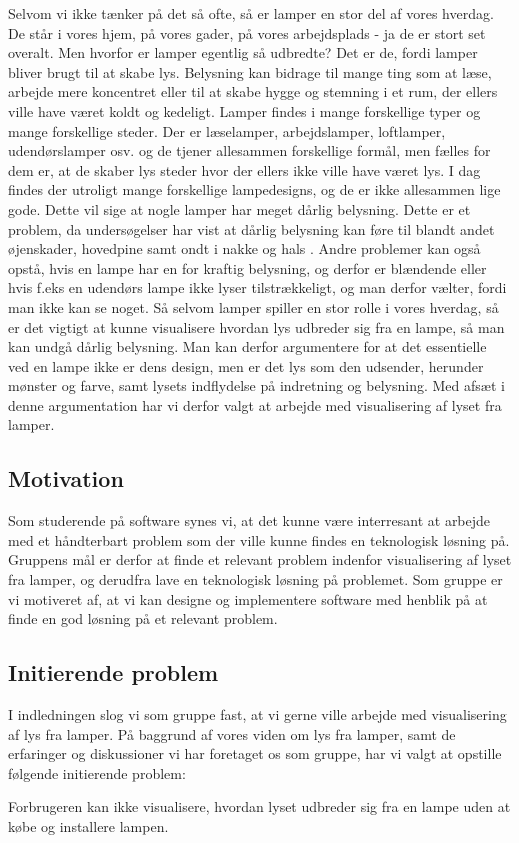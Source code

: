 Selvom vi ikke tænker på det så ofte, så er lamper en stor del af vores hverdag. De står i vores hjem, på vores gader, på vores arbejdsplads - ja de er stort set overalt. Men hvorfor er lamper egentlig så udbredte? Det er de, fordi lamper bliver brugt til at skabe lys. Belysning kan bidrage til mange ting som at læse, arbejde mere koncentret eller til at skabe hygge og stemning i et rum, der ellers ville have været koldt og kedeligt. 
\newline Lamper findes i mange forskellige typer og mange forskellige steder. Der er læselamper, arbejdslamper, loftlamper, udendørslamper osv. og de tjener allesammen forskellige formål, men fælles for dem er, at de skaber lys steder hvor der ellers ikke ville have været lys. 
I dag findes der utroligt mange forskellige lampedesigns, og de er ikke allesammen lige gode. Dette vil sige at nogle lamper har meget dårlig belysning. Dette er et problem, da undersøgelser har vist at dårlig belysning kan føre til blandt andet øjenskader, hovedpine samt ondt i nakke og hals \cite{lys_konsekvenser}. Andre problemer kan også opstå, hvis en lampe har en for kraftig belysning, og derfor er blændende eller hvis f.eks en udendørs lampe ikke lyser tilstrækkeligt, og man derfor vælter, fordi man ikke kan se noget. 
Så selvom lamper spiller en stor rolle i vores hverdag, så er det vigtigt at kunne visualisere hvordan lys udbreder sig fra en lampe, så man kan undgå dårlig belysning. 
\newline Man kan derfor argumentere for at det essentielle ved en lampe ikke er dens design, men er det lys som den udsender, herunder mønster og farve, samt lysets indflydelse på indretning og belysning. Med afsæt i denne argumentation har vi derfor valgt at arbejde med visualisering af lyset fra lamper.

\subsection{Motivation}

Som studerende på software synes vi, at det kunne være interresant at arbejde med et håndterbart problem som der ville kunne findes en teknologisk løsning på. 
\newline Gruppens mål er derfor at finde et relevant problem indenfor visualisering af lyset fra lamper, og derudfra lave en teknologisk løsning på problemet. Som gruppe er vi motiveret af, at vi kan designe og implementere software med henblik på at finde en god løsning på et relevant problem. 

\subsection{Initierende problem}

I indledningen slog vi som gruppe fast, at vi gerne ville arbejde med visualisering af lys fra lamper. På baggrund af vores viden om lys fra lamper, samt de erfaringer og diskussioner vi har foretaget os som gruppe, har vi valgt at opstille følgende initierende problem:

Forbrugeren kan ikke visualisere, hvordan lyset udbreder sig fra en lampe uden at købe og installere lampen.